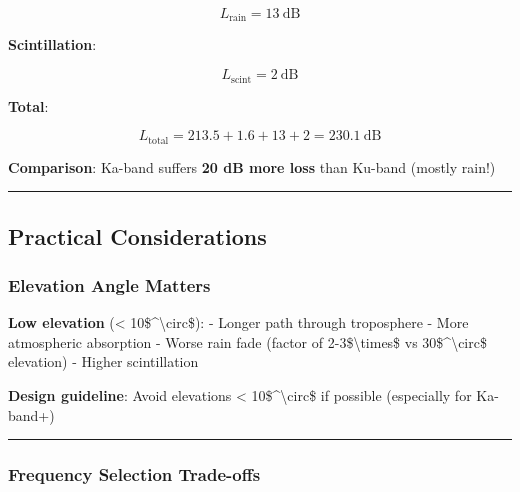 \[
L_{\text{rain}} = 13\ \text{dB}
\]

\textbf{Scintillation}:

\[
L_{\text{scint}} = 2\ \text{dB}
\]

\textbf{Total}:

\[
L_{\text{total}} = 213.5 + 1.6 + 13 + 2 = 230.1\ \text{dB}
\]

\textbf{Comparison}: Ka-band suffers \textbf{20 dB more loss} than
Ku-band (mostly rain!)

\begin{center}\rule{0.5\linewidth}{0.5pt}\end{center}

\subsection{Practical Considerations}\label{practical-considerations}

\subsubsection{Elevation Angle Matters}\label{elevation-angle-matters}

\textbf{Low elevation} (\textless{} 10\$\^{}\textbackslash circ\$): -
Longer path through troposphere - More atmospheric absorption - Worse
rain fade (factor of 2-3\$\textbackslash times\$ vs
30\$\^{}\textbackslash circ\$ elevation) - Higher scintillation

\textbf{Design guideline}: Avoid elevations \textless{}
10\$\^{}\textbackslash circ\$ if possible (especially for Ka-band+)

\begin{center}\rule{0.5\linewidth}{0.5pt}\end{center}

\subsubsection{Frequency Selection
Trade-offs}\label{frequency-selection-trade-offs}


